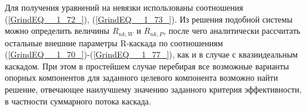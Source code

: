 Для получения уравнений на невязки использованы соотношения (\ref{GrindEQ__1_72_}), (\ref{GrindEQ__1_73_}). Из решения подобной системы можно определить величины $R_{n k,W}$ и $R_{n k,P}$, после чего аналитически рассчитать остальные внешние параметры R-каскада по соотношениям (\ref{GrindEQ__1_70_})-(\ref{GrindEQ__1_77_}), как и в случае с квазиидеальным каскадом. При этом в простейшем случае перебирая все возможные варианты опорных компонентов для заданного целевого компонента возможно найти решение, отвечающее наилучшему значению заданного критерия эффективности, в частности суммарного потока каскада.


